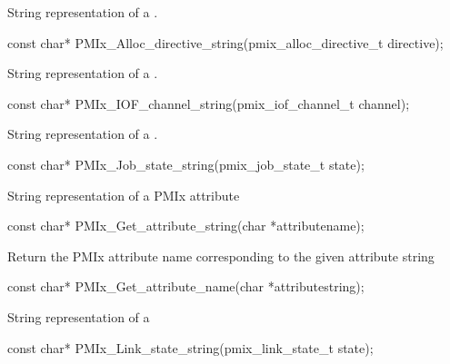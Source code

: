 \summary
{}

String representation of a .

\cspecificstart
\begin{codepar}
const char*
PMIx_Alloc_directive_string(pmix_alloc_directive_t directive);
\end{codepar}
\cspecificend

\summary
{}

String representation of a .

\cspecificstart
\begin{codepar}
const char*
PMIx_IOF_channel_string(pmix_iof_channel_t channel);
\end{codepar}
\cspecificend

\summary
{}

String representation of a .

\cspecificstart
\begin{codepar}
const char*
PMIx_Job_state_string(pmix_job_state_t state);
\end{codepar}
\cspecificend


\summary
{}

String representation of a \ac{PMIx} attribute

\cspecificstart
\begin{codepar}
const char*
PMIx_Get_attribute_string(char *attributename);
\end{codepar}
\cspecificend


\summary
{}

Return the \ac{PMIx} attribute name corresponding to the given attribute string

\cspecificstart
\begin{codepar}
const char*
PMIx_Get_attribute_name(char *attributestring);
\end{codepar}
\cspecificend


\summary
{}

String representation of a 

\cspecificstart
\begin{codepar}
const char*
PMIx_Link_state_string(pmix_link_state_t state);
\end{codepar}
\cspecificend



